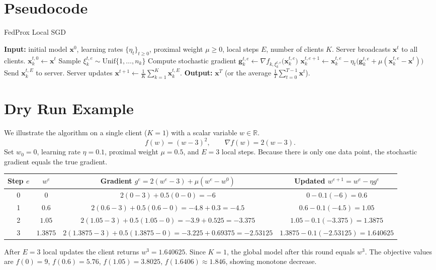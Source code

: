 \documentclass{article}
\begin{document}
\section*{Pseudocode}
\begin{algorithm}[H]
\caption{FedProx Local SGD}
\begin{algorithmic}[1]
\STATE \textbf{Input:} initial model $\mathbf{x}^{0}$, learning rates $\{\eta_t\}_{t\ge0}$,
proximal weight $\mu\ge0$, local steps $E$, number of clients $K$.
    \STATE Server broadcasts $\mathbf{x}^{t}$ to all clients.
        \STATE $\mathbf{x}_{k}^{t,0}\gets\mathbf{x}^{t}$
            \STATE Sample $\xi_{k}^{t,e}\sim\text{Unif}\{1,\dots,n_k\}$
            \STATE Compute stochastic gradient 
            $\mathbf{g}_{k}^{t,e}\gets\nabla f_{k,\xi_{k}^{t,e}}\!\bigl(\mathbf{x}_{k}^{t,e}\bigr)$
            \STATE $\mathbf{x}_{k}^{t,e+1}\gets
            \mathbf{x}_{k}^{t,e}
            -\eta_t\bigl(\mathbf{g}_{k}^{t,e}
            +\mu(\mathbf{x}_{k}^{t,e}-\mathbf{x}^{t})\bigr)$
        \ENDFOR
        \STATE Send $\mathbf{x}_{k}^{t,E}$ to server.
    \ENDFOR
    \STATE Server updates $\displaystyle\mathbf{x}^{t+1}\gets\frac{1}{K}\sum_{k=1}^{K}\mathbf{x}_{k}^{t,E}$.
\ENDFOR
\STATE \textbf{Output:} $\mathbf{x}^{T}$ (or the average $\frac{1}{T}\sum_{t=0}^{T-1}\mathbf{x}^{t}$).
\end{algorithmic}
\end{algorithm}

\section*{Dry Run Example}
We illustrate the algorithm on a single client ($K=1$) with a scalar variable $w\in\mathbb{R}$.
\[
f(w)=(w-3)^2,\qquad
\nabla f(w)=2(w-3).
\]
Set $w_0=0$, learning rate $\eta=0.1$, proximal weight $\mu=0.5$, and $E=3$ local steps.
Because there is only one data point, the stochastic gradient equals the true gradient.

\begin{center}
\begin{tabular}{c|c|c|c}
Step $e$ & $w^{e}$ & Gradient $g^{e}=2(w^{e}-3)+\mu(w^{e}-w^{0})$ & Updated $w^{e+1}=w^{e}-\eta g^{e}$\\\hline
0 & $0$ & $2(0-3)+0.5(0-0)=-6$ & $0-0.1(-6)=0.6$\\
1 & $0.6$ & $2(0.6-3)+0.5(0.6-0)=-4.8+0.3=-4.5$ & $0.6-0.1(-4.5)=1.05$\\
2 & $1.05$ & $2(1.05-3)+0.5(1.05-0)=-3.9+0.525=-3.375$ & $1.05-0.1(-3.375)=1.3875$\\
3 & $1.3875$ & $2(1.3875-3)+0.5(1.3875-0)=-3.225+0.69375=-2.53125$ & $1.3875-0.1(-2.53125)=1.640625$
\end{tabular}
\end{center}
After $E=3$ local updates the client returns $w^{3}=1.640625$.
Since $K=1$, the global model after this round equals $w^{3}$.
The objective values are $f(0)=9$, $f(0.6)=5.76$, $f(1.05)=3.8025$, $f(1.6406)\approx1.846$,
showing monotone decrease.
\end{document}
